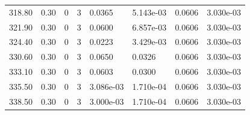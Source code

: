 \documentclass[preview]{standalone}
\begin{document}
{{{\begin{tabular}{L{1.2cm}C{1.2cm} C{0.3cm}C{0.5cm} C{1.4cm}C{1.4cm} C{1.4cm}C{1.4cm}}
  318.80  &  0.30  & 0     &  3 &  0.0365  & 5.143e-03  & 0.0606 &  3.030e-03   \\ 
  321.90  &  0.30  & 0     &  3 &  0.0600  & 6.857e-03  & 0.0606 &  3.030e-03   \\ 
  324.40  &  0.30  & 0     &  3 &  0.0223  & 3.429e-03  & 0.0606 &  3.030e-03   \\ 
  330.60  &  0.30  & 0     &  3 &  0.0650  & 0.0326  & 0.0606 &  3.030e-03   \\ 
  333.10  &  0.30  & 0     &  3 &  0.0603  & 0.0300  & 0.0606 &  3.030e-03   \\ 
  335.50  &  0.30  & 0     &  3 &  3.086e-03  & 1.710e-04  & 0.0606 &  3.030e-03   \\ 
  338.50  &  0.30  & 0     &  3 &  3.000e-03  & 1.710e-04  & 0.0606 &  3.030e-03   \\ 
\hline 
\end{tabular} 

}}}
\end{document}
